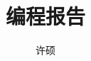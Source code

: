 \documentclass[10pt]{article}
\begin{document}
    \title{编程报告}
    \author{许硕}
    \maketitle
\end{document}
